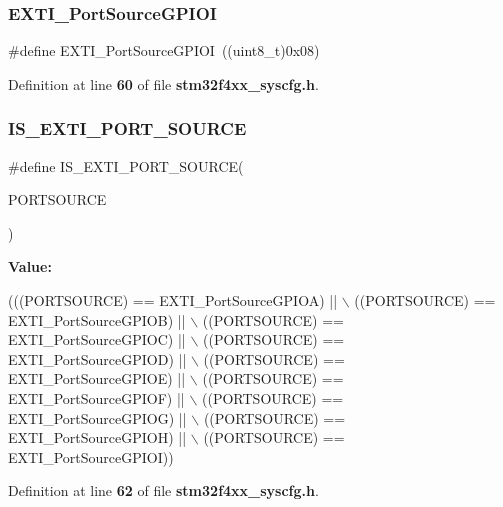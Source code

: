 \mbox{\label{group__SYSCFG__EXTI__Port__Sources_ga9f57956fd533afa9b5d323601842c74e}} 
\subsubsection{E\+X\+T\+I\+\_\+\+Port\+Source\+G\+P\+I\+OI}
{\footnotesize\ttfamily \#define E\+X\+T\+I\+\_\+\+Port\+Source\+G\+P\+I\+OI~((uint8\+\_\+t)0x08)}



Definition at line \textbf{ 60} of file \textbf{ stm32f4xx\+\_\+syscfg.\+h}.

\mbox{\label{group__SYSCFG__EXTI__Port__Sources_gaec9c6d2a4276fc14c4e147631a0efe92}} 
\subsubsection{I\+S\+\_\+\+E\+X\+T\+I\+\_\+\+P\+O\+R\+T\+\_\+\+S\+O\+U\+R\+CE}
{\footnotesize\ttfamily \#define I\+S\+\_\+\+E\+X\+T\+I\+\_\+\+P\+O\+R\+T\+\_\+\+S\+O\+U\+R\+CE(\begin{DoxyParamCaption}\item[{}]{P\+O\+R\+T\+S\+O\+U\+R\+CE }\end{DoxyParamCaption})}

{\bfseries Value\+:}
\begin{DoxyCode}
(((PORTSOURCE) == EXTI_PortSourceGPIOA) || \(\backslash\)
                                        ((PORTSOURCE) == EXTI_PortSourceGPIOB) || \(\backslash\)
                                        ((PORTSOURCE) == EXTI_PortSourceGPIOC) || \(\backslash\)
                                        ((PORTSOURCE) == EXTI_PortSourceGPIOD) || \(\backslash\)
                                        ((PORTSOURCE) == EXTI_PortSourceGPIOE) || \(\backslash\)
                                        ((PORTSOURCE) == EXTI_PortSourceGPIOF) || \(\backslash\)
                                        ((PORTSOURCE) == EXTI_PortSourceGPIOG) || \(\backslash\)
                                        ((PORTSOURCE) == EXTI_PortSourceGPIOH) || \(\backslash\)
                                        ((PORTSOURCE) == EXTI_PortSourceGPIOI))
\end{DoxyCode}


Definition at line \textbf{ 62} of file \textbf{ stm32f4xx\+\_\+syscfg.\+h}.

